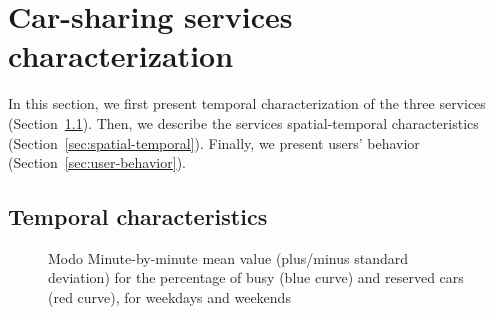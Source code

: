 \section{Car-sharing services characterization} 
\label{sec:4_4_characterization}

In this section, we first present temporal characterization of the three services (Section~\ref{sec:temporal_characterization}). Then, we describe the services spatial-temporal characteristics (Section~\ref{sec:spatial-temporal}). Finally, we present users' behavior (Section~\ref{sec:user-behavior}).

\subsection{Temporal characteristics}\label{sec:temporal_characterization}


\begin{figure}
	\centering
	\qquad
	\caption{Modo Minute-by-minute mean value (plus/minus standard deviation) for  the  percentage of busy (blue curve) and reserved cars (red curve), for weekdays and weekends}
	\label{fig:4_4_modo_busy}%
\end{figure}


